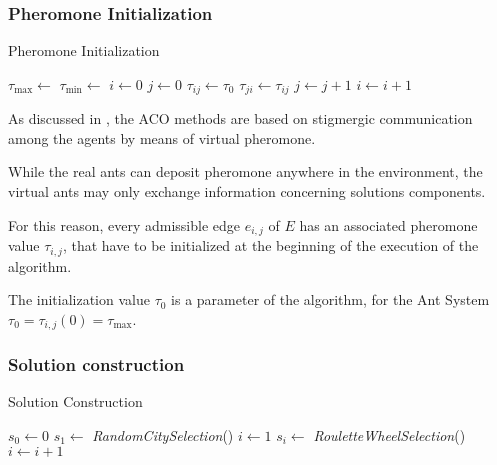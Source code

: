 \begin{homeworkProblem}
\subsubsection{Pheromone Initialization}
\begin{algorithm}[!h]
  \caption{Pheromone Initialization}\label{init}
  \begin{algorithmic}[1]
      \State $\tau_{\max} \gets $
      \State $\tau_{\min} \gets $
      \State $i \gets 0$
      \State $j \gets 0$
          \State $\tau_{ij} \gets \tau_0$
          \State $\tau_{ji} \gets \tau_{ij}$
          \State $ j \gets j + 1$  
        \EndFor
        \State $ i \gets i + 1$ 
      \EndFor
    \EndProcedure
\end{algorithmic}
\end{algorithm}

As discussed in , the ACO methods are based on stigmergic communication among the agents by means of virtual pheromone.

While the real ants can deposit pheromone anywhere in the environment, the virtual ants may only exchange information concerning solutions components.

For this reason, every admissible edge $e_{i,j}$ of $E$ has an associated pheromone value $\tau_{i,j}$, that have to be initialized at the beginning of the execution of the algorithm.

The initialization value $\tau_0$ is a parameter of the algorithm, for the \maxmin Ant System $\tau_0 = \tau_{i,j}(0) = \tau_{\max}$. 


\subsubsection{Solution construction}
\begin{algorithm}[!h]
  \caption{Solution Construction}\label{sol}
  \begin{algorithmic}[1]
      \State {}
      \State $s_0 \gets 0$ 
      \State $s_1 \gets$ \emph{RandomCitySelection}() 
      \State $i \gets 1$
        \State $s_i \gets $ \emph{RouletteWheelSelection}()  
        \State $i \gets i+1$
      \EndWhile
    \EndProcedure
\end{algorithmic}
\end{algorithm}


\end{homeworkProblem}
